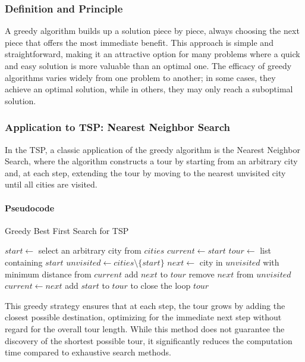 \subsubsection{Definition and Principle}

A greedy algorithm builds up a solution piece by piece, always choosing the next piece that offers the most immediate benefit. This approach is simple and straightforward, making it an attractive option for many problems where a quick and easy solution is more valuable than an optimal one. The efficacy of greedy algorithms varies widely from one problem to another; in some cases, they achieve an optimal solution, while in others, they may only reach a suboptimal solution.

\subsubsection{Application to TSP: Nearest Neighbor Search}

In the TSP, a classic application of the greedy algorithm is the Nearest Neighbor Search, where the algorithm constructs a tour by starting from an arbitrary city and, at each step, extending the tour by moving to the nearest unvisited city until all cities are visited.

\paragraph{Pseudocode}

\begin{algorithm}
	\caption{Greedy Best First Search for TSP}\label{alg:greedybestfirst}
	\begin{algorithmic}[1]
		\State $start \gets$ select an arbitrary city from $cities$
		\State $current \gets start$
		\State $tour \gets$ list containing $start$
		\State $unvisited \gets cities \setminus \{start\}$
		\State $next \gets$ city in $unvisited$ with minimum distance from $current$
		\State add $next$ to $tour$
		\State remove $next$ from $unvisited$
		\State $current \gets next$
		\EndWhile
		\State add $start$ to $tour$ to close the loop
		\State \Return $tour$
		\EndProcedure
	\end{algorithmic}
\end{algorithm}

This greedy strategy ensures that at each step, the tour grows by adding the closest possible destination, optimizing for the immediate next step without regard for the overall tour length. While this method does not guarantee the discovery of the shortest possible tour, it significantly reduces the computation time compared to exhaustive search methods.

